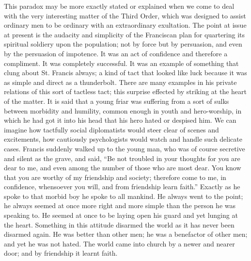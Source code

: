 \documentclass{book}
\begin{document}
This paradox may be more exactly stated or explained when we come to deal with the very interesting matter of the Third Order, which was designed to assist ordinary men to be ordinary with an extraordinary exultation. The point at issue at present is the audacity and simplicity of the Franciscan plan for quartering its spiritual soldiery upon the population; not by force but by persuasion, and even by the persuasion of impotence. It was an act of confidence and therefore a compliment. It was completely successful. It was an example of something that clung about St. Francis always; a kind of tact that looked like luck because it was as simple and direct as a thunderbolt. There are many examples in his private relations of this sort of tactless tact; this surprise effected by striking at the heart of the matter. It is said that a young friar was suffering from a sort of sulks between morbidity and humility, common enough in youth and hero-worship, in which he had got it into his head that his hero hated or despised him. We can imagine how tactfully social diplomatists would steer clear of scenes and excitements, how cautiously psychologists would watch and handle such delicate cases. Francis suddenly walked up to the young man, who was of course secretive and silent as the grave, and said, “Be not troubled in your thoughts for you are dear to me, and even among the number of those who are most dear. You know that you are worthy of my friendship and society; therefore come to me, in confidence, whensoever you will, and from friendship learn faith.” Exactly as he spoke to that morbid boy he spoke to all mankind. He always went to the point; he always seemed at once more right and more simple than the person he was speaking to. He seemed at once to be laying open his guard and yet lunging at the heart. Something in this attitude disarmed the world as it has never been disarmed again. He was better than other men; he was a benefactor of other men; and yet he was not hated. The world came into church by a newer and nearer door; and by friendship it learnt faith.
\end{document}
